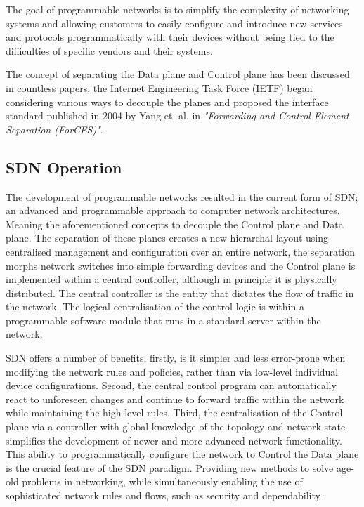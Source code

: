 \documentclass[12pt, oneside]{book}
\begin{document}
The goal of programmable networks is to simplify the complexity of networking systems and allowing customers to
easily configure and introduce new services and protocols programmatically with 
their devices without being tied to the difficulties of specific vendors and their systems.

The concept of separating the Data plane and Control plane has been discussed in countless papers,
the Internet Engineering Task Force (IETF) began considering various ways to decouple the planes
and proposed the interface standard published in 2004 by Yang et. al. in
\emph{"Forwarding and Control Element Separation (ForCES)"}.\cite{yang2004forwarding}


\subsection{SDN Operation}
The development of programmable networks resulted in the current form of SDN;
an advanced and programmable approach to computer network architectures. Meaning the aforementioned concepts
to decouple the Control plane and Data plane.
The separation of these planes creates a new hierarchal layout using centralised
management and configuration over an entire network, the separation 
morphs network switches into simple forwarding devices and the Control plane is implemented within a
central controller, although in principle it is physically distributed. The central controller is the entity that
dictates the flow of traffic in the network.
The logical centralisation of the control logic is within a programmable software module
that runs in a standard server within the network. \newline

SDN offers a number of benefits, firstly, is it simpler and less
error-prone when modifying the network rules and policies, rather than via low-level individual
device configurations. Second, the central control program can automatically react to unforeseen changes and
continue to forward traffic within the network while maintaining the high-level
rules.
Third, the centralisation of the Control plane via a controller with global knowledge of the
topology and network state simplifies the development of newer and more advanced network functionality.
This ability to programmatically configure the network to Control the Data plane is the crucial feature of the SDN paradigm.
Providing new methods to solve age-old problems in networking, while simultaneously enabling
the use of sophisticated network rules and flows, such as security and dependability \cite{kreutz2013towards}.
\end{document}
